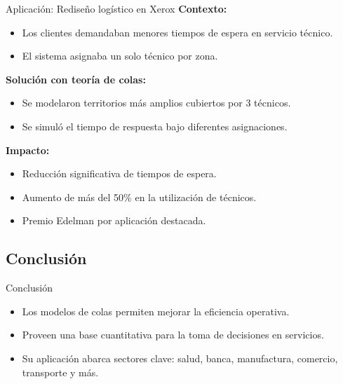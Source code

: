 \documentclass{beamer}
\begin{document}
\begin{frame}{Aplicación: Rediseño logístico en Xerox}
\textbf{Contexto:}
\begin{itemize}
    \item Los clientes demandaban menores tiempos de espera en servicio técnico.
    \item El sistema asignaba un solo técnico por zona.
\end{itemize}

\textbf{Solución con teoría de colas:}
\begin{itemize}
    \item Se modelaron territorios más amplios cubiertos por 3 técnicos.
    \item Se simuló el tiempo de respuesta bajo diferentes asignaciones.
\end{itemize}

\textbf{Impacto:}
\begin{itemize}
    \item Reducción significativa de tiempos de espera.
    \item Aumento de más del 50\% en la utilización de técnicos.
    \item Premio Edelman por aplicación destacada.
\end{itemize}
\end{frame}

\subsection{Conclusión}
\begin{frame}{Conclusión}
\begin{itemize}
    \item Los modelos de colas permiten mejorar la eficiencia operativa.
    \item Proveen una base cuantitativa para la toma de decisiones en servicios.
    \item Su aplicación abarca sectores clave: salud, banca, manufactura, comercio, transporte y más.
\end{itemize}
\end{frame}
\end{document}
